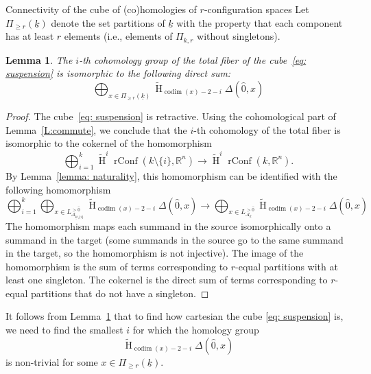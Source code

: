 \documentclass[12pt]{amsart}
\newcommand{\R}{{\mathbb R}}
\newcommand{\Ho}{\operatorname{H}}
\newcommand{\rConf}{\operatorname{rConf}}
\newcommand{\codim}{\operatorname{codim}}
\newcommand{\calA}{{\mathcal{A}}}
\theoremstyle{plain}
\newtheorem{lemma}[thm]{Lemma}
\theoremstyle{definition}
\theoremstyle{remark}
\begin{document}
\begin{section}{Connectivity of the cube of (co)homologies of $r$-configuration spaces}
Let $\Pi_{\geq r}(\underline{k})$ denote the set partitions of $\underline{k}$ with the property that each component has at least $r$ elements (i.e., elements of $\Pi_{k, r}$ without singletons). 
\begin{lemma}\label{L:totalcokernel}
The $i$-th cohomology group of the total fiber of the cube~\eqref{eq: suspension} is isomorphic to the following direct sum:
\begin{equation}\label{E:tcokernel}
\bigoplus_{x\in \Pi_{\geq r}(\underline{k})} \widetilde{\Ho}_{\codim{(x)}-2-i}\Delta(\hat{0},x)
\end{equation}
\end{lemma}
\begin{proof}
The cube~\eqref{eq: suspension} is retractive. Using the cohomological part of Lemma~\ref{L:commute}, we conclude that the $i$-th cohomology of the total fiber is isomorphic to the cokernel of the homomorphism
\[
\bigoplus_{i=1}^k \widetilde{\Ho}^i\rConf(k \setminus \{i\}, \R^n) \to \widetilde{\Ho}^i\rConf(k, \R^n).
\]
By Lemma~\ref{lemma: naturality}, this homomorphism can be identified with the following homomorphism
\begin{equation}
\bigoplus_{i=1}^k\bigoplus_{x\in{L^{>\hat{0}}_{{\calA}_{\underline{k} \setminus\{i\}}}}} \widetilde{\Ho}_{\codim(x)-2-i}\Delta(\hat{0},x)\to \bigoplus_{x\in{L^{>\hat{0}}_{{\calA}_k}}} \widetilde{\Ho}_{\codim(x)-2-i}\Delta(\hat{0},x)
\end{equation}
The homomorphism maps each summand in the source isomorphically onto a summand in the target (some summands in the source go to the same summand in the target, so the homomorphism is not injective). The image of the homomorphism is the sum of terms corresponding to $r$-equal partitions with at least one singleton. The cokernel is the direct sum of terms corresponding to $r$-equal partitions that do not have a singleton.
\end{proof}



It follows from Lemma~\ref{L:totalcokernel} that to find how cartesian the cube \eqref{eq: suspension} is, we need to find the smallest $i$ for which the homology group
\begin{equation}\label{E:homologyofcomplex}
\widetilde{\Ho}_{\codim(x)-2-i}\Delta(\hat{0},x)
\end{equation}
is non-trivial for some $x\in \Pi_{\ge r}(\underline{k})$.  


\end{section}
\end{document}
